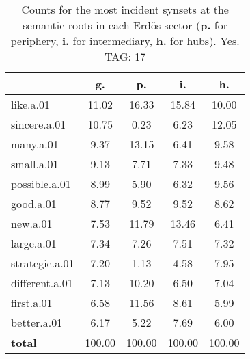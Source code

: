 \begin{table}[h!]
\begin{center}
\begin{tabular}{| l || c | c | c | c |}\hline
 & {\bf g.} & {\bf p.} & {\bf i.} & {\bf h.} \\\hline\hline
like.a.01 & 11.02  & 16.33  & 15.84  & 10.00 \\\hline
sincere.a.01 & 10.75  & 0.23  & 6.23  & 12.05 \\\hline
many.a.01 & 9.37  & 13.15  & 6.41  & 9.58 \\\hline
small.a.01 & 9.13  & 7.71  & 7.33  & 9.48 \\\hline
possible.a.01 & 8.99  & 5.90  & 6.32  & 9.56 \\\hline
good.a.01 & 8.77  & 9.52  & 9.52  & 8.62 \\\hline
new.a.01 & 7.53  & 11.79  & 13.46  & 6.41 \\\hline
large.a.01 & 7.34  & 7.26  & 7.51  & 7.32 \\\hline
strategic.a.01 & 7.20  & 1.13  & 4.58  & 7.95 \\\hline
different.a.01 & 7.13  & 10.20  & 6.50  & 7.04 \\\hline
first.a.01 & 6.58  & 11.56  & 8.61  & 5.99 \\\hline
better.a.01 & 6.17  & 5.22  & 7.69  & 6.00 \\\hline\hline
{{\bf total}} & 100.00  & 100.00  & 100.00  & 100.00 \\\hline
\end{tabular}
\caption{Counts for the most incident synsets at the semantic roots in each Erd\"os sector ({\bf p.} for periphery, {\bf i.} for intermediary, {\bf h.} for hubs). Yes. TAG: 17}
\end{center}
\end{table}
